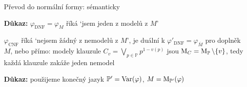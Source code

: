 \documentclass{beamer}
\begin{document}
\begin{frame}{Převod do normální formy: sémanticky}
    

    \pause

    \textbf{Důkaz:} $\varphi_{\mathrm{DNF}}=\varphi_M$ říká  \alert{`jsem jeden z modelů z $M$'}

    \pause

    $\varphi_{\mathrm{CNF}}$ říká \alert{`nejsem žádný z nemodelů z $M$'}, je duální k $\varphi'_{\mathrm{DNF}}=\varphi_{\overline{M}}$ pro doplněk $M$, nebo přímo: modely klauzule $C_v=\bigvee_{p\in\mathbb P}p^{1-v(p)}$ jsou $\operatorname{M}_C=\operatorname{M}_\mathbb P\setminus\{v\}$, tedy každá klauzule zakáže jeden nemodel\hfill\qedsymbol

    \pause
    \medskip

    \pause
    \textbf{Důkaz:} použijeme konečný jazyk $\mathbb P'=\operatorname{Var}(\varphi)$, $M=\operatorname{M}_{\mathbb P'}(\varphi)$\hfill\qedsymbol

\end{frame}
\end{document}
